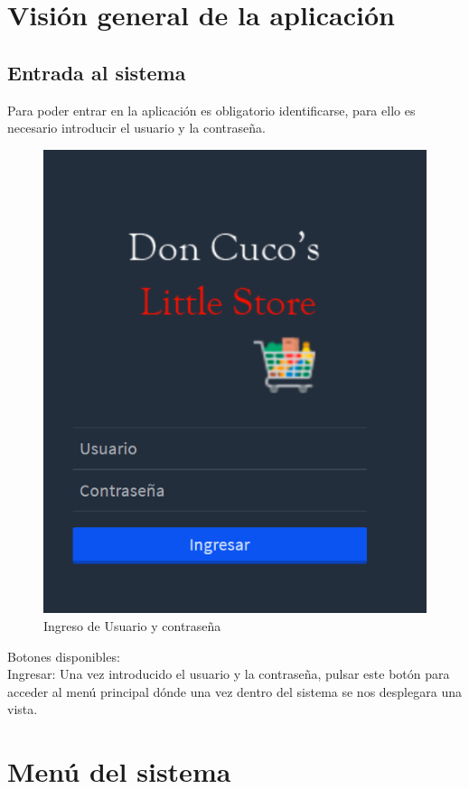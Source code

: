 \documentclass[a4paper,DIV=12]{scrreprt}
\begin{document}
\clearpage

\section{Visión general de la aplicación}
\subsection{Entrada al sistema} 
Para poder entrar en la aplicación es obligatorio identificarse, para ello es necesario introducir el usuario y la contraseña.

	\begin{figure}[!htb]
		\centering
		\includegraphics[scale=0.4]{Login.PNG}
		\caption{Ingreso de Usuario y contraseña}
	\end{figure}

 Botones disponibles:\\

Ingresar:  Una vez introducido el usuario y la contraseña, pulsar este botón para acceder al menú principal dónde una vez dentro del sistema se nos desplegara una vista.
\clearpage

\section{Menú del sistema}
\end{document}

